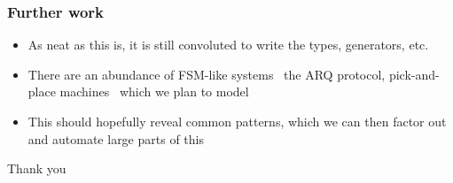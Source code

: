 \documentclass[compress,handout]{beamer}
\begin{document}


\begin{frame}
  \frametitle{Further work}

  \begin{itemize}
    \item<1-> As neat as this is, it is still convoluted to write the types,
              generators, etc.
    \item<2-> There are an abundance of FSM-like systems \textemdash\ the ARQ
              protocol, pick-and-place machines \textemdash\ which we plan to
              model
    \item<3-> This should hopefully reveal common patterns, which we can then
              factor out and automate large parts of this
  \end{itemize}

\end{frame}


\begin{frame}

  \begin{center}
    \textcolor<1>{staDarkGreen}{\Large Thank you}
  \end{center}

\end{frame}
\end{document}
